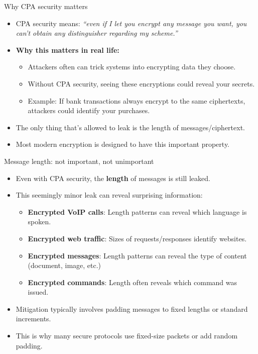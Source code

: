 \documentclass[aspectratio=169, lualatex, handout]{beamer}
\begin{document}
\begin{frame}{Why CPA security matters}
	\begin{itemize}[<+->]
		\item CPA security means: \textit{``even if I let you encrypt any message you want, you can't obtain any distinguisher regarding my scheme.''}
		\item \textbf{Why this matters in real life:}
		      \begin{itemize}[<+->]
			      \item Attackers often can trick systems into encrypting data they choose.
			      \item Without CPA security, seeing these encryptions could reveal your secrets.
			      \item Example: If bank transactions always encrypt to the same ciphertexts, attackers could identify your purchases.
		      \end{itemize}
		\item The only thing that's allowed to leak is the length of messages/ciphertext.
		\item Most modern encryption is designed to have this important property.
	\end{itemize}
\end{frame}

\begin{frame}{Message length: not important, not unimportant}
	\begin{itemize}[<+->]
		\item Even with CPA security, the \textbf{length} of messages is still leaked.
		\item This seemingly minor leak can reveal surprising information:
		      \begin{itemize}[<+->]
			      \item \textbf{Encrypted VoIP calls}: Length patterns can reveal which language is spoken.
			      \item \textbf{Encrypted web traffic}: Sizes of requests/responses identify websites.
			      \item \textbf{Encrypted messages}: Length patterns can reveal the type of content (document, image, etc.)
			      \item \textbf{Encrypted commands}: Length often reveals which command was issued.
		      \end{itemize}
		\item Mitigation typically involves padding messages to fixed lengths or standard increments.
		\item This is why many secure protocols use fixed-size packets or add random padding.
	\end{itemize}
\end{frame}
\end{document}
